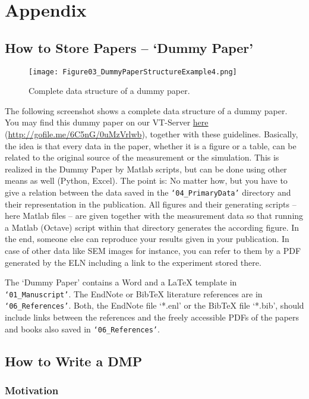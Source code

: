 \section{Appendix}
\subsection{How to Store Papers – `Dummy Paper'}\label{app:dummy-paper}
\begin{wrapfigure}{r}{0.5\linewidth}
  \vspace{-1em}
  \texttt{[image: Figure03\_DummyPaperStructureExample4.png]}
  \caption{Complete data structure of a dummy paper.}
  \label{fig:dummy-paper}
\end{wrapfigure}
The following screenshot shows a complete data structure of a dummy paper.
You may find this dummy paper on our VT-Server
\href{http://gofile.me/6C5nG/0uMzVrlwb}{here}
(\url{http://gofile.me/6C5nG/0uMzVrlwb}),
together with these guidelines. Basically, the idea is that every data in the
paper, whether it is a figure or a table, can be related to the original source
of the measurement or the simulation. This is realized in the Dummy Paper by
Matlab scripts, but can be done using other means as well (Python, Excel). The
point is: No matter how, but you have to give a relation between the data saved
in the \texttt{‘04\_PrimaryData’} directory and their representation in the
publication. All figures and their generating scripts – here Matlab files – are
given together with the measurement data so that running a Matlab (Octave)
script within that directory generates the according figure. In the end, someone
else can reproduce your results given in your publication. In case of other data
like SEM images for instance, you can refer to them by a PDF generated by the
ELN including a link to the experiment stored there.

The `Dummy Paper' contains a Word and a LaTeX template in
\texttt{‘01\_Manuscript’}. The EndNote or BibTeX literature references are in
\texttt{‘06\_References’}. Both, the EndNote file ‘*.enl’ or the BibTeX file
‘*.bib’, should include links between the references and the freely accessible
PDFs of the papers and books also saved in \texttt{‘06\_References’}.

\subsection{How to Write a DMP}

\subsubsection{Motivation}

